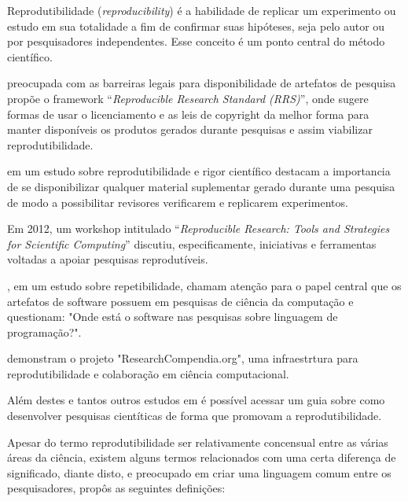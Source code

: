 Reprodutibilidade ({\it reproducibility}) é a habilidade de replicar um
experimento ou estudo em sua totalidade a fim de confirmar suas hipóteses, seja
pelo autor ou por pesquisadores independentes. Esse conceito é um ponto central
do método científico.

 preocupada com as barreiras legais para
disponibilidade de artefatos de pesquisa propõe o framework ``{\it Reproducible
Research Standard (RRS)}'', onde sugere formas de usar o licenciamento e as leis
de copyright da melhor forma para manter disponíveis os produtos gerados
durante pesquisas e assim viabilizar reprodutibilidade.

em um estudo sobre reprodutibilidade e rigor científico destacam a importancia
de se disponibilizar qualquer material suplementar gerado durante uma pesquisa
de modo a possibilitar revisores verificarem e replicarem experimentos.

Em
2012, um workshop intitulado ``{\it Reproducible Research: Tools and Strategies for
Scientific Computing}'' \cite{stodden_reproducible_2012} discutiu, especificamente, iniciativas
e ferramentas voltadas a apoiar pesquisas reprodutíveis.

, em um estudo sobre repetibilidade, chamam
atenção para o papel central que os artefatos de software possuem em pesquisas
de ciência da computação e questionam: "Onde está o software nas pesquisas
sobre linguagem de programação?".

 demonstram o
projeto "ResearchCompendia.org", uma infraestrtura para reprodutibilidade e
colaboração em ciência computacional.

Além destes e tantos outros estudos em
\cite{github2016reproducibility} é possível acessar um guia sobre como
desenvolver pesquisas cientíticas de forma que promovam a reprodutibilidade.

Apesar do termo reprodutibilidade ser relativamente concensual entre as várias
áreas da ciência, existem alguns termos relacionados com uma certa diferença
de significado, diante disto, e preocupado em criar uma linguagem comum entre
os pesquisadores,  propôs as seguintes definições:

